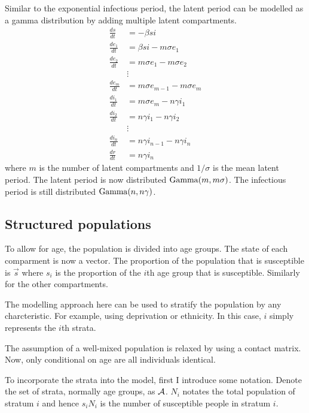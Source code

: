 \documentclass[thesis.tex]{subfiles}
\begin{document}
Similar to the exponential infectious period, the latent period can be modelled as a gamma distribution by adding multiple latent compartments.
\begin{align}
\frac{ds}{dt} &= -\beta si \\
\frac{de_1}{dt} &= \beta si - m\sigma e_1 \\
\frac{de_2}{dt} &= m\sigma e_1 - m \sigma e_2 \\
&\vdots \nonumber \\
\frac{de_m}{dt} &= m\sigma e_{m-1} - m \sigma e_m \\
\frac{di_1}{dt} &= m\sigma e_m - n\gamma i_1 \\
\frac{di_2}{dt} &= n\gamma i_1 - n \gamma i_2 \\
&\vdots \nonumber \\
\frac{di_n}{dt} &= n\gamma i_{n-1} - n \gamma i_n \\
\frac{dr}{dt} &= n\gamma i_n
\end{align}
where $m$ is the number of latent compartments and $1/\sigma$ is the mean latent period.
The latent period is now distributed $\operatorname{Gamma}(m, m\sigma)$.
The infectious period is still distributed $\operatorname{Gamma}(n, n\gamma)$.


\subsection{Structured populations} \label{SEIR:sec:structured-populations}


To allow for age, the population is divided into age groups.
The state of each comparment is now a vector.
The proportion of the population that is susceptible is $\vec{s}$ where $s_i$ is the proportion of the $i$th age group that is susceptible.
Similarly for the other compartments.

The modelling approach here can be used to stratify the population by any charcteristic.
For example, using deprivation or ethnicity.
In this case, $i$ simply represents the $i$th strata.

The assumption of a well-mixed population is relaxed by using a contact matrix.
Now, only conditional on age are all individuals identical.

To incorporate the strata into the model, first I introduce some notation.
Denote the set of strata, normally age groups, as $\mathcal{A}$. $N_i$ notates the total population of stratum $i$ and hence $s_i N_i$ is the number of susceptible people in stratum $i$.
\end{document}
